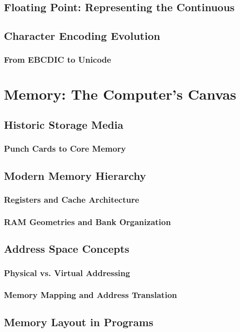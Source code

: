 \documentclass[12pt, oneside]{book}
\begin{document}
	\section{Floating Point: Representing the Continuous}
	\section{Character Encoding Evolution}
	\subsection{From EBCDIC to Unicode}
	
	\chapter{Memory: The Computer's Canvas}
	\section{Historic Storage Media}
	\subsection{Punch Cards to Core Memory}
	\section{Modern Memory Hierarchy}
	\subsection{Registers and Cache Architecture}
	\subsection{RAM Geometries and Bank Organization}
	\section{Address Space Concepts}
	\subsection{Physical vs. Virtual Addressing}
	\subsection{Memory Mapping and Address Translation}
	\section{Memory Layout in Programs}
\end{document}
